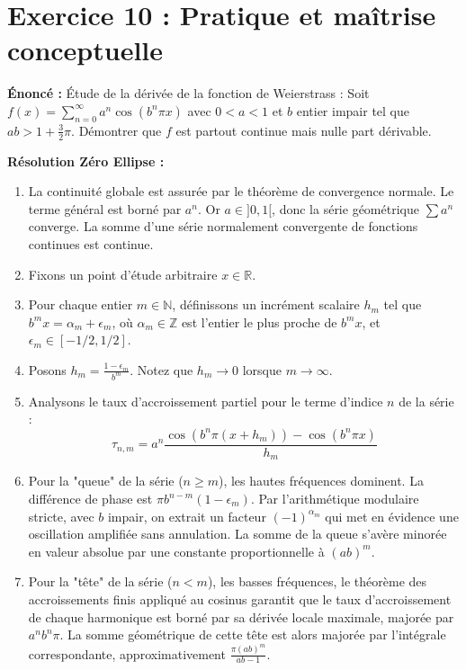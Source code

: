 \documentclass[11pt,a4paper]{article}
\begin{document}
\vspace{1em}

\section*{Exercice 10 : Pratique et maîtrise conceptuelle}

\textbf{Énoncé :}
Étude de la dérivée de la fonction de Weierstrass : Soit $f(x) = \sum_{n=0}^{\infty} a^n \cos(b^n \pi x)$ avec $0 < a < 1$ et $b$ entier impair tel que $ab > 1 + \frac{3}{2}\pi$. Démontrer que $f$ est partout continue mais nulle part dérivable.

\textbf{Résolution Zéro Ellipse :}
\begin{enumerate}
\item La continuité globale est assurée par le théorème de convergence normale. Le terme général est borné par $a^n$. Or $a \in ]0,1[$, donc la série géométrique $\sum a^n$ converge. La somme d'une série normalement convergente de fonctions continues est continue.
\item Fixons un point d'étude arbitraire $x \in \mathbb{R}$.
\item Pour chaque entier $m \in \mathbb{N}$, définissons un incrément scalaire $h_m$ tel que $b^m x = \alpha_m + \epsilon_m$, où $\alpha_m \in \mathbb{Z}$ est l'entier le plus proche de $b^m x$, et $\epsilon_m \in [-1/2, 1/2]$.
\item Posons $h_m = \frac{1 - \epsilon_m}{b^m}$. Notez que $h_m \to 0$ lorsque $m \to \infty$.
\item Analysons le taux d'accroissement partiel pour le terme d'indice $n$ de la série :
   \[  \tau_{n,m} = a^n \frac{\cos(b^n \pi (x+h_m)) - \cos(b^n \pi x)}{h_m}  \]
\item Pour la "queue" de la série ($n \geq m$), les hautes fréquences dominent. La différence de phase est $\pi b^{n-m} (1-\epsilon_m)$. Par l'arithmétique modulaire stricte, avec $b$ impair, on extrait un facteur $(-1)^{\alpha_m}$ qui met en évidence une oscillation amplifiée sans annulation. La somme de la queue s'avère minorée en valeur absolue par une constante proportionnelle à $(ab)^m$.
\item Pour la "tête" de la série ($n < m$), les basses fréquences, le théorème des accroissements finis appliqué au cosinus garantit que le taux d'accroissement de chaque harmonique est borné par sa dérivée locale maximale, majorée par $a^n b^n \pi$. La somme géométrique de cette tête est alors majorée par l'intégrale correspondante, approximativement $\frac{\pi (ab)^m}{ab-1}$.

\end{enumerate}
\end{document}
